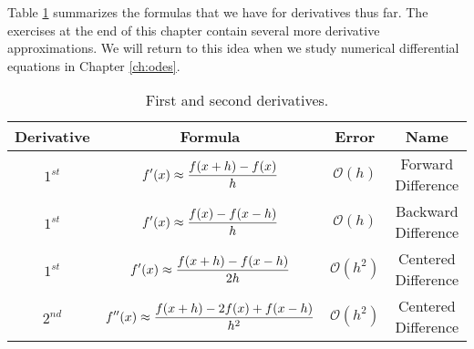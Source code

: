 Table \ref{tab:first_and_second_derivatives} summarizes the formulas that we have for
derivatives thus far. The exercises at the end of this chapter contain several more
derivative approximations.  We will return to this idea when we study numerical
differential equations in Chapter \ref{ch:odes}.
\begin{table}
    \centering
    \begin{tabular}{|c|c|c|c|}
        \hline
        Derivative & Formula & Error & Name \\ \hline \hline
        $1^{st}$ & $\displaystyle f'(x) \approx \frac{f(x+h) - f(x)}{h}$ & $\mathcal{O}(h)$ & Forward
        Difference \\ \hline
        $1^{st}$ & $\displaystyle f'(x) \approx \frac{f(x) - f(x-h)}{h}$ & $\mathcal{O}(h)$ & Backward
        Difference \\ \hline
        $1^{st}$ & $\displaystyle f'(x) \approx \frac{f(x+h) - f(x-h)}{2h}$ & $\mathcal{O}(h^2)$ &
        Centered Difference \\ \hline
        $2^{nd}$ & $\displaystyle f''(x) \approx \frac{f(x+h) - 2f(x) + f(x-h)}{h^2}$ &
        $\mathcal{O}(h^2)$ & Centered Difference \\ \hline
    \end{tabular}
    \caption{First and second derivatives.}
    \label{tab:first_and_second_derivatives}
\end{table}


